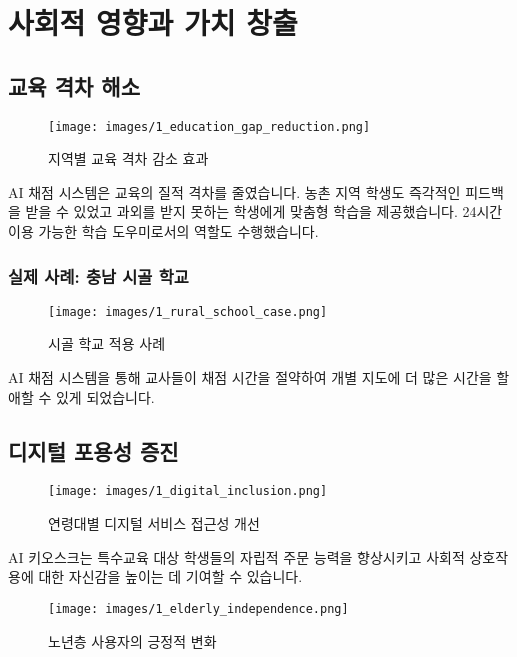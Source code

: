 \section{사회적 영향과 가치 창출}

\subsection{교육 격차 해소}

\begin{figure}[H]
    \centering
    \texttt{[image: images/1\_education\_gap\_reduction.png]}
    \caption{지역별 교육 격차 감소 효과}
    \label{fig:education_gap_reduction}
\end{figure}

AI 채점 시스템은 교육의 질적 격차를 줄였습니다. 농촌 지역 학생도 즉각적인 피드백을 받을 수 있었고 과외를 받지 못하는 학생에게 맞춤형 학습을 제공했습니다. 24시간 이용 가능한 학습 도우미로서의 역할도 수행했습니다.

\subsubsection{실제 사례: 충남 시골 학교}

\begin{figure}[H]
    \centering
    \texttt{[image: images/1\_rural\_school\_case.png]}
    \caption{시골 학교 적용 사례}
    \label{fig:rural_school_case}
\end{figure}

AI 채점 시스템을 통해 교사들이 채점 시간을 절약하여 개별 지도에 더 많은 시간을 할애할 수 있게 되었습니다.

\subsection{디지털 포용성 증진}

\begin{figure}[H]
    \centering
    \texttt{[image: images/1\_digital\_inclusion.png]}
    \caption{연령대별 디지털 서비스 접근성 개선}
    \label{fig:digital_inclusion}
\end{figure}

AI 키오스크는 특수교육 대상 학생들의 자립적 주문 능력을 향상시키고 사회적 상호작용에 대한 자신감을 높이는 데 기여할 수 있습니다.

\begin{figure}[H]
    \centering
    \texttt{[image: images/1\_elderly\_independence.png]}
    \caption{노년층 사용자의 긍정적 변화}
    \label{fig:elderly_independence}
\end{figure}

